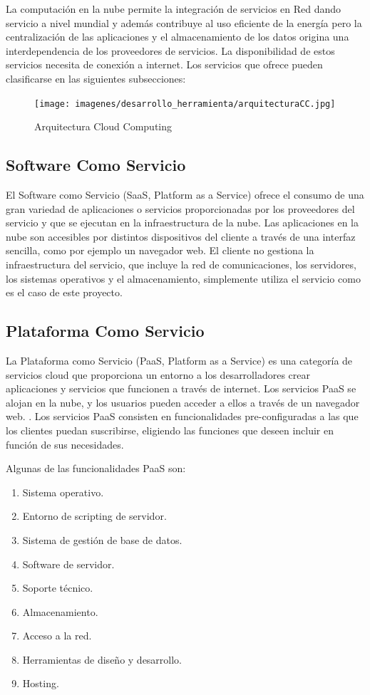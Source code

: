 \documentclass[a4paper,11pt]{book}
\begin{document}
La computación en la nube permite la integración de servicios en Red dando servicio a nivel mundial y además contribuye al uso eficiente de la energía pero la centralización de las aplicaciones y el almacenamiento de los datos origina una interdependencia de los proveedores de servicios. La disponibilidad de estos servicios necesita de conexión a internet. Los servicios que ofrece pueden clasificarse en las siguientes subsecciones: 

 
\begin{figure}[H] 
\centering 
\texttt{[image: imagenes/desarrollo\_herramienta/arquitecturaCC.jpg]}
\caption{ Arquitectura Cloud Computing\cite{arquitecturaCC} }
\end{figure}

\subsection{Software Como Servicio}

El Software como Servicio\cite{saas} (SaaS, Platform as a Service) ofrece el consumo de una gran variedad de aplicaciones o servicios proporcionadas por los proveedores del servicio y que se ejecutan en la infraestructura de la nube. Las aplicaciones en la nube son accesibles por distintos dispositivos del cliente a través de una interfaz sencilla, como por ejemplo un navegador web. El cliente no gestiona la infraestructura del servicio, que incluye la red de comunicaciones, los servidores, los sistemas operativos y el almacenamiento, simplemente utiliza el servicio como es el caso de este proyecto. 

\subsection{Plataforma Como Servicio}

La Plataforma como Servicio\cite{paas} (PaaS, Platform as a Service) es una categoría de servicios cloud que proporciona un entorno a los desarrolladores crear aplicaciones y servicios que funcionen a través de internet. Los servicios PaaS se alojan en la nube, y los usuarios pueden acceder a ellos a través de un navegador web. . Los servicios PaaS consisten en funcionalidades pre-configuradas a las que los clientes puedan suscribirse, eligiendo las funciones que deseen incluir en función de sus necesidades.

Algunas de las funcionalidades PaaS son:

\begin{enumerate}
\item Sistema operativo. 
\item Entorno de scripting de servidor. 
\item Sistema de gestión de base de datos. 
\item Software de servidor. 
\item Soporte técnico. 
\item Almacenamiento. 
\item Acceso a la red. 
\item Herramientas de diseño y desarrollo. 
\item Hosting. 
\end{enumerate}
\end{document}
